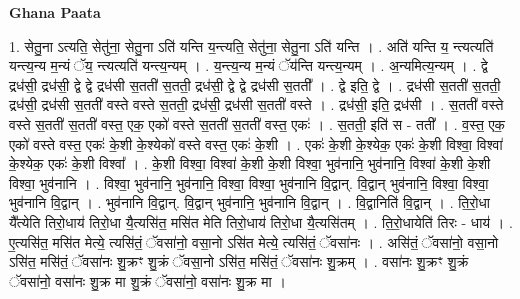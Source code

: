 \documentclass[17pt]{extarticle}
\begin{document}
\textbf{Ghana Paata } \newline

1. सेतु॒ना ऽत्यति॒ सेतु॑ना॒ सेतु॒ना ऽति॑ यन्ति य॒न्त्यति॒ सेतु॑ना॒ सेतु॒ना ऽति॑ यन्ति । . अति॑ यन्ति य॒ न्त्यत्यति॑ यन्त्य॒न्य म॒न्यं ॅय॒ न्त्यत्यति॑ यन्त्य॒न्यम् । . य॒न्त्य॒न्य म॒न्यं ॅय॑न्ति यन्त्य॒न्यम् । . अ॒न्यमित्य॒न्यम् । . द्वे द्रध॑सी॒ द्रध॑सी॒ द्वे द्वे द्रध॑सी स॒तती॑ स॒तती॒ द्रध॑सी॒ द्वे द्वे द्रध॑सी स॒तती᳚ । . द्वे इति॒ द्वे । . द्रध॑सी स॒तती॑ स॒तती॒ द्रध॑सी॒ द्रध॑सी स॒तती॑ वस्ते वस्ते स॒तती॒ द्रध॑सी॒ द्रध॑सी स॒तती॑ वस्ते । . द्रध॑सी॒ इति॒ द्रध॑सी । . स॒तती॑ वस्ते वस्ते स॒तती॑ स॒तती॑ वस्त॒ एक॒ एको॑ वस्ते स॒तती॑ स॒तती॑ वस्त॒ एकः॑ । . स॒तती॒ इति॑ स - तती᳚ । . व॒स्त॒ एक॒ एको॑ वस्ते वस्त॒ एकः॑ के॒शी के॒श्येको॑ वस्ते वस्त॒ एकः॑ के॒शी । . एकः॑ के॒शी के॒श्येक॒ एकः॑ के॒शी विश्वा॒ विश्वा॑ के॒श्येक॒ एकः॑ के॒शी विश्वा᳚ । . के॒शी विश्वा॒ विश्वा॑ के॒शी के॒शी विश्वा॒ भुव॑नानि॒ भुव॑नानि॒ विश्वा॑ के॒शी के॒शी विश्वा॒ भुव॑नानि । . विश्वा॒ भुव॑नानि॒ भुव॑नानि॒ विश्वा॒ विश्वा॒ भुव॑नानि वि॒द्वान्. वि॒द्वान् भुव॑नानि॒ विश्वा॒ विश्वा॒ भुव॑नानि वि॒द्वान् । . भुव॑नानि वि॒द्वान्. वि॒द्वान् भुव॑नानि॒ भुव॑नानि वि॒द्वान् । . वि॒द्वानिति॑ वि॒द्वान् । . ति॒रो॒धा यै᳚त्येति तिरो॒धाय॑ तिरो॒धा यै॒त्यसि॑त॒ मसि॑त मेति तिरो॒धाय॑ तिरो॒धा यै॒त्यसि॑तम् । . ति॒रो॒धायेति॑ तिरः - धाय॑ । . ए॒त्यसि॑त॒ मसि॑त मेत्ये॒ त्यसि॑तं॒ ॅवसा॑नो॒ वसा॒नो ऽसि॑त मेत्ये॒ त्यसि॑तं॒ ॅवसा॑नः । . असि॑तं॒ ॅवसा॑नो॒ वसा॒नो ऽसि॑त॒ मसि॑तं॒ ॅवसा॑नः शु॒क्रꣳ शु॒क्रं ॅवसा॒नो ऽसि॑त॒ मसि॑तं॒ ॅवसा॑नः शु॒क्रम् । . वसा॑नः शु॒क्रꣳ शु॒क्रं ॅवसा॑नो॒ वसा॑नः शु॒क्र मा शु॒क्रं ॅवसा॑नो॒ वसा॑नः शु॒क्र मा । \newline
\end{document}
